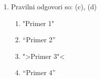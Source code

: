 \documentclass[11pt]{article}
\begin{document}
\begin{enumerate}
      \item Pravilni odgovori so: (c), (d)%
        \begin{enumerate}
          \item "Primer 1"
          \item ``Primer 2''
          \item ">Primer 3"<
          \item "`Primer 4"'
        \end{enumerate}
    
\end{enumerate}
\end{document}
